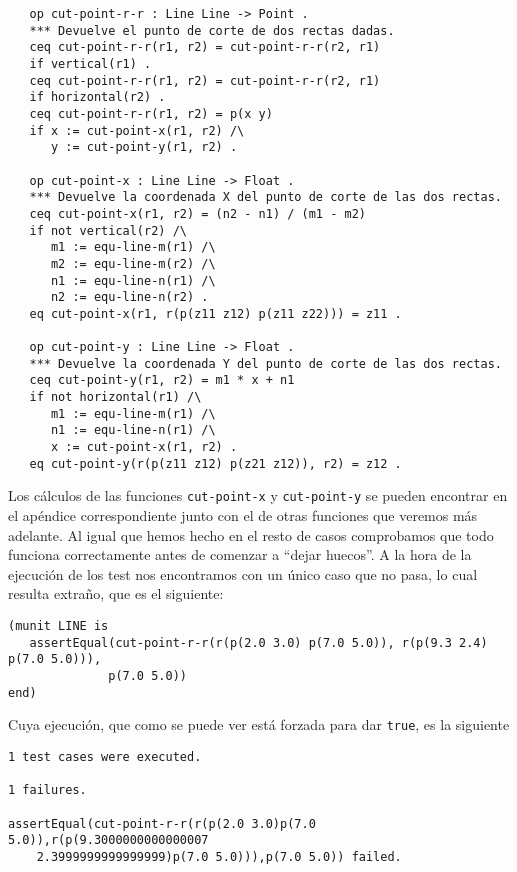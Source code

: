 {\codesize
\begin{verbatim}	
   op cut-point-r-r : Line Line -> Point .
   *** Devuelve el punto de corte de dos rectas dadas.
   ceq cut-point-r-r(r1, r2) = cut-point-r-r(r2, r1)
   if vertical(r1) .
   ceq cut-point-r-r(r1, r2) = cut-point-r-r(r2, r1)
   if horizontal(r2) .
   ceq cut-point-r-r(r1, r2) = p(x y)
   if x := cut-point-x(r1, r2) /\
      y := cut-point-y(r1, r2) .

   op cut-point-x : Line Line -> Float .
   *** Devuelve la coordenada X del punto de corte de las dos rectas.
   ceq cut-point-x(r1, r2) = (n2 - n1) / (m1 - m2)
   if not vertical(r2) /\
      m1 := equ-line-m(r1) /\
      m2 := equ-line-m(r2) /\
      n1 := equ-line-n(r1) /\
      n2 := equ-line-n(r2) .
   eq cut-point-x(r1, r(p(z11 z12) p(z11 z22))) = z11 .
	
   op cut-point-y : Line Line -> Float .
   *** Devuelve la coordenada Y del punto de corte de las dos rectas.
   ceq cut-point-y(r1, r2) = m1 * x + n1
   if not horizontal(r1) /\
      m1 := equ-line-m(r1) /\
      n1 := equ-line-n(r1) /\
      x := cut-point-x(r1, r2) .
   eq cut-point-y(r(p(z11 z12) p(z21 z12)), r2) = z12 .
\end{verbatim}
}

Los cálculos de las funciones \texttt{cut-point-x} y \texttt{cut-point-y} se pueden encontrar en el apéndice correspondiente junto con el de otras funciones que veremos más adelante. Al igual que hemos hecho en el resto de casos comprobamos que todo funciona correctamente antes de comenzar a ``dejar huecos''. A la hora de la ejecución de los test nos encontramos con un único caso que no pasa, lo cual resulta extraño, que es el siguiente: \par

{\codesize
\begin{verbatim}
(munit LINE is
   assertEqual(cut-point-r-r(r(p(2.0 3.0) p(7.0 5.0)), r(p(9.3 2.4) p(7.0 5.0))),
              p(7.0 5.0))
end)
\end{verbatim}
}

Cuya ejecución, que como se puede ver está forzada para dar \texttt{true}, es la siguiente

{\codesize
\begin{verbatim}
1 test cases were executed.

1 failures.

assertEqual(cut-point-r-r(r(p(2.0 3.0)p(7.0 5.0)),r(p(9.3000000000000007
    2.3999999999999999)p(7.0 5.0))),p(7.0 5.0)) failed.

\end{verbatim}
}

